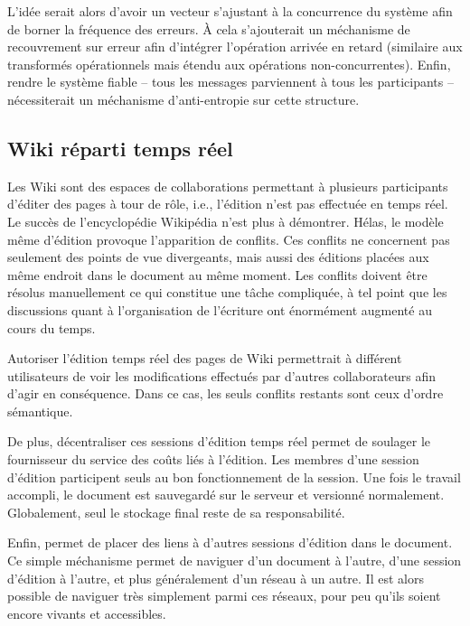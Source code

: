 L'idée serait alors d'avoir un vecteur s'ajustant à la concurrence du système
afin de borner la fréquence des erreurs. À cela s'ajouterait un méchanisme de
recouvrement sur erreur afin d'intégrer l'opération arrivée en retard (similaire
aux transformés opérationnels mais étendu aux opérations non-concurrentes).
Enfin, rendre le système fiable -- tous les messages parviennent à tous les
participants -- nécessiterait un méchanisme d'anti-entropie sur cette structure.

\subsection{Wiki réparti temps réel}

Les Wiki sont des espaces de collaborations permettant à plusieurs participants
d'éditer des pages à tour de rôle, i.e., l'édition n'est pas effectuée en temps
réel. Le succès de l'encyclopédie Wikipédia n'est plus à démontrer. Hélas, le
modèle même d'édition provoque l'apparition de conflits. Ces conflits ne
concernent pas seulement des points de vue divergeants, mais aussi des éditions
placées aux même endroit dans le document au même moment. Les conflits doivent
être résolus manuellement ce qui constitue une tâche compliquée, à tel point que
les discussions quant à l'organisation de l'écriture ont énormément augmenté au
cours du temps.

Autoriser l'édition temps réel des pages de Wiki permettrait à différent
utilisateurs de voir les modifications effectués par d'autres collaborateurs
afin d'agir en conséquence. Dans ce cas, les seuls conflits restants sont ceux
d'ordre sémantique.

De plus, décentraliser ces sessions d'édition temps réel permet de soulager le
fournisseur du service des coûts liés à l'édition. Les membres d'une session
d'édition participent seuls au bon fonctionnement de la session. Une fois le
travail accompli, le document est sauvegardé sur le serveur et versionné
normalement. Globalement, seul le stockage final reste de sa responsabilité.

Enfin, \CRATE permet de placer des liens à d'autres sessions d'édition dans le
document. Ce simple méchanisme permet de naviguer d'un document à l'autre, d'une
session d'édition à l'autre, et plus généralement d'un réseau à un autre. Il est
alors possible de naviguer très simplement parmi ces réseaux, pour peu qu'ils
soient encore vivants et accessibles.


